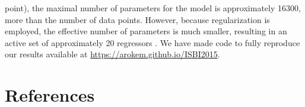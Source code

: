 \documentclass[3p]{elsarticle}
\begin{document}
point), the maximal number of parameters for the model is approximately 16300, more than the number of data points. However, because regularization is employed, the effective number of parameters is much smaller, resulting in an active set of approximately 20 regressors \cite{Zou2007}. We have made code to fully reproduce our results available at \url{https://arokem.github.io/ISBI2015}.

\section*{References}

\end{document}
